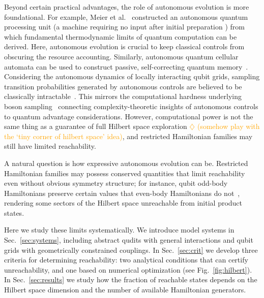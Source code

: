 \documentclass[aps,prx,reprint,superscriptaddress,footnote, twocolumn,notitlepage]{revtex4-2}
\newcommand{\ko}[1]{\textcolor{orange}{#1}}
\newcommand{\todoko}[1]{\ko{$\diamondsuit$ #1}}
\begin{document}
Beyond certain practical advantages, the role of autonomous evolution is more foundational. For example, Meier et al.~\cite{meier_autonomous_2024} constructed an autonomous quantum processing unit (a machine requiring no input after initial preparation
) from which fundamental thermodynamic limits of quantum computation can be derived. Here, autonomous evolution is crucial to keep classical controls from obscuring the resource accounting. Similarly, autonomous quantum cellular automata can be used to construct passive, self-correcting quantum memory~\cite{dunnweber_quantum_2026}. 
Considering the autonomous dynamics of locally interacting qubit grids, sampling transition probabilities generated by autonomous controls are believed to be classically intractable~\cite{quek2025quantumadvantagerandomgeometricallytwolocal, park2023hardnessquantumspindynamics}. This mirrors the computational hardness underlying boson sampling~\cite{aaronson_computational_2010} connecting complexity-theoretic insights of autonomous controls to quantum advantage considerations.
However, computational power is not the same thing as a guarantee of full Hilbert space exploration \todoko{(somehow play with the `tiny corner of hilbert space' idea)}, and restricted Hamiltonian families may still have limited reachability.

A natural question is how expressive autonomous evolution can be. Restricted Hamiltonian families may possess conserved quantities that limit reachability even without obvious symmetry structure; for instance, qubit odd-body Hamiltonians preserve certain values that even-body Hamiltonians do not~\cite{wyderka_constraints_2018}, rendering some sectors of the Hilbert space unreachable from initial product states.

Here we study these limits systematically. We introduce model systems in Sec.~\ref{sec:systems}, including abstract qudits with general interactions and qubit grids with geometrically constrained couplings. In Sec.~\ref{sec:crit} we develop three criteria for determining reachability: two analytical conditions that can certify unreachability, and one based on numerical optimization (see Fig.~\ref{fig:hilbert}). In Sec.~\ref{sec:results} we study how the fraction of reachable states depends on the Hilbert space dimension and the number of available Hamiltonian generators.
\end{document}
